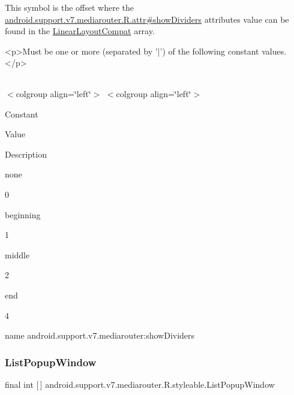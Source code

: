This symbol is the offset where the \hyperlink{classandroid_1_1support_1_1v7_1_1mediarouter_1_1R_1_1attr_a15ec98a1d65d2408a839345928a6c59d}{android.\+support.\+v7.\+mediarouter.\+R.\+attr\#show\+Dividers} attribute\textquotesingle{}s value can be found in the \hyperlink{classandroid_1_1support_1_1v7_1_1mediarouter_1_1R_1_1styleable_a47eee9f8c488407b3ea7145bb65c01b9}{Linear\+Layout\+Compat} array.

\begin{DoxyVerb}      <p>Must be one or more (separated by '|') of the following constant values.</p>
\end{DoxyVerb}
 \tabulinesep=1mm
\begin{longtabu} spread 0pt [c]{*{0}{|X[-1]}|}
\hline
\end{longtabu}
$<$colgroup align=\char`\"{}left\char`\"{}$>$ $<$colgroup align=\char`\"{}left\char`\"{}$>$ 

Constant

Value

Description 

{\ttfamily none}

0

{\ttfamily beginning}

1

{\ttfamily middle}

2

{\ttfamily end}

4

name android.\+support.\+v7.\+mediarouter\+:show\+Dividers \mbox{\label{classandroid_1_1support_1_1v7_1_1mediarouter_1_1R_1_1styleable_abd77b8b3a632f63ef1efadea7d411dd4}} 
\subsubsection{\texorpdfstring{List\+Popup\+Window}{ListPopupWindow}}
{\footnotesize\ttfamily final int \mbox{[}$\,$\mbox{]} android.\+support.\+v7.\+mediarouter.\+R.\+styleable.\+List\+Popup\+Window\hspace{0.3cm}{\ttfamily [static]}}

